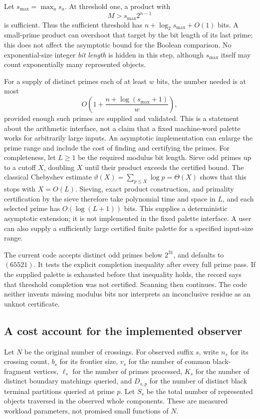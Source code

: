 Let $s_{\max}=\max_a s_a$. At threshold one, a product with
\[
                   M>s_{\max}2^{n-1}
\]
is sufficient. Thus the sufficient threshold has $n+\log_2 s_{\max}+O(1)$ bits.
A small-prime product can overshoot that target by the bit length of its last
prime; this does not affect the asymptotic bound for the Boolean comparison. No exponential-size
integer \emph{bit length} is hidden in this step, although $s_{\max}$ itself
may count exponentially many represented objects.

For a supply of distinct primes each of at least $w$ bits, the number needed
is at most
\[
 O\!\left(1+\frac{n+\log(s_{\max}+1)}{w}\right),
\]
provided enough such primes are supplied and validated. This is a statement
about the arithmetic interface, not a claim that a fixed machine-word palette
works for arbitrarily large inputs. An asymptotic implementation can enlarge
the prime range and include the cost of finding and certifying the primes.
For completeness, let $L\ge1$ be the required modulus bit length. Sieve
odd primes up to a cutoff $X$, doubling $X$ until their product exceeds the
certified bound. The classical Chebyshev estimate
$\vartheta(X)=\sum_{p\le X}\log p=\Theta(X)$ \cite{chebyshevnotes}
shows that this stops with $X=O(L)$. Sieving, exact product construction,
and primality certification by the sieve therefore take polynomial time and
space in $L$, and each selected prime has $O(\log(L+1))$ bits. This supplies
a deterministic asymptotic extension; it is not implemented in the fixed
palette interface. A user can also supply a sufficiently large certified
finite palette for a specified input-size range.

The current code accepts distinct odd primes below $2^{31}$, and defaults to
$(65521)$. It tests the explicit completion inequality after every full prime
pass. If the supplied palette is exhausted before that inequality holds, the
record says that threshold completion was not certified. Scanning then
continues. The code neither invents missing modulus bits nor interprets an
inconclusive residue as an unknot certificate.

\subsection{A cost account for the implemented observer}

Let $N$ be the original number of crossings. For observed suffix $s$, write
$n_s$ for its crossing count, $b_s$ for its frontier size, $v_s$ for the number
of common black-fragment vertices, $\ell_s$ for the number of primes processed,
$K_s$ for the number of distinct boundary matchings queried, and $D_{s,p}$
for the number of distinct black terminal partitions queried at prime $p$.
Let $S_s$ be the total number of represented objects traversed in the observed
whole components. These are measured workload parameters, not promised small
functions of $N$.


